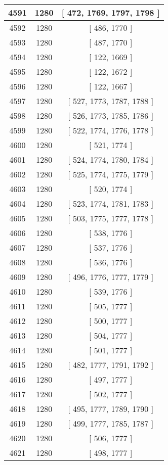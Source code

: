 \begin{center}
\begin{longtable}[H]{|| c c c ||}
\hline
4591 & 1280 & [ 472, 1769, 1797, 1798 ] \\ 
\hline
4592 & 1280 & [ 486, 1770 ] \\ 
\hline
4593 & 1280 & [ 487, 1770 ] \\ 
\hline
4594 & 1280 & [ 122, 1669 ] \\ 
\hline
4595 & 1280 & [ 122, 1672 ] \\ 
\hline
4596 & 1280 & [ 122, 1667 ] \\ 
\hline
4597 & 1280 & [ 527, 1773, 1787, 1788 ] \\ 
\hline
4598 & 1280 & [ 526, 1773, 1785, 1786 ] \\ 
\hline
4599 & 1280 & [ 522, 1774, 1776, 1778 ] \\ 
\hline
4600 & 1280 & [ 521, 1774 ] \\ 
\hline
4601 & 1280 & [ 524, 1774, 1780, 1784 ] \\ 
\hline
4602 & 1280 & [ 525, 1774, 1775, 1779 ] \\ 
\hline
4603 & 1280 & [ 520, 1774 ] \\ 
\hline
4604 & 1280 & [ 523, 1774, 1781, 1783 ] \\ 
\hline
4605 & 1280 & [ 503, 1775, 1777, 1778 ] \\ 
\hline
4606 & 1280 & [ 538, 1776 ] \\ 
\hline
4607 & 1280 & [ 537, 1776 ] \\ 
\hline
4608 & 1280 & [ 536, 1776 ] \\ 
\hline
4609 & 1280 & [ 496, 1776, 1777, 1779 ] \\ 
\hline
4610 & 1280 & [ 539, 1776 ] \\ 
\hline
4611 & 1280 & [ 505, 1777 ] \\ 
\hline
4612 & 1280 & [ 500, 1777 ] \\ 
\hline
4613 & 1280 & [ 504, 1777 ] \\ 
\hline
4614 & 1280 & [ 501, 1777 ] \\ 
\hline
4615 & 1280 & [ 482, 1777, 1791, 1792 ] \\ 
\hline
4616 & 1280 & [ 497, 1777 ] \\ 
\hline
4617 & 1280 & [ 502, 1777 ] \\ 
\hline
4618 & 1280 & [ 495, 1777, 1789, 1790 ] \\ 
\hline
4619 & 1280 & [ 499, 1777, 1785, 1787 ] \\ 
\hline
4620 & 1280 & [ 506, 1777 ] \\ 
\hline
4621 & 1280 & [ 498, 1777 ] \\ 
\hline

\end{longtable}
\end{center}
